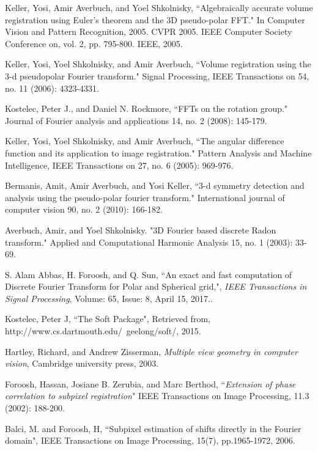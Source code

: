 \documentclass{UCF_ETD}
\begin{document}
\begin{thebibliography}{99}
Keller, Yosi, Amir Averbuch, and Yoel Shkolnisky, ``Algebraically accurate volume registration using Euler's theorem and the 3D pseudo-polar FFT." In Computer Vision and Pattern Recognition, 2005. CVPR 2005. IEEE Computer Society Conference on, vol. 2, pp. 795-800. IEEE, 2005.

Keller, Yosi, Yoel Shkolnisky, and Amir Averbuch, ``Volume registration using the 3-d pseudopolar Fourier transform." Signal Processing, IEEE Transactions on 54, no. 11 (2006): 4323-4331.

Kostelec, Peter J., and Daniel N. Rockmore, ``FFTs on the rotation group." Journal of Fourier analysis and applications 14, no. 2 (2008): 145-179.


Keller, Yosi, Yoel Shkolnisky, and Amir Averbuch, ``The angular difference function and its application to image registration." Pattern Analysis and Machine Intelligence, IEEE Transactions on 27, no. 6 (2005): 969-976.

Bermanis, Amit, Amir Averbuch, and Yosi Keller, ``3-d symmetry detection and analysis using the pseudo-polar fourier transform." International journal of computer vision 90, no. 2 (2010): 166-182.

Averbuch, Amir, and Yoel Shkolnisky. "3D Fourier based discrete Radon transform." Applied and Computational Harmonic Analysis 15, no. 1 (2003): 33-69.

S. Alam Abbas, H. Foroosh, and Q. Sun, ``An exact and fast computation of Discrete Fourier Transform for Polar and Spherical grid,", \emph{IEEE Transactions in Signal Processing}, Volume: 65, Issue: 8, April 15, 2017..

Kostelec, Peter J, ``The Soft Package", Retrieved from, http://www.cs.dartmouth.edu/~geelong/soft/, 2015.


{Hartley, Richard, and Andrew Zisserman, \emph{Multiple view geometry in computer vision}, Cambridge university press, 2003.}

Foroosh, Hassan, Josiane B. Zerubia, and Marc Berthod, ``\emph{Extension of phase correlation to subpixel registration}" IEEE Transactions on Image Processing,  11.3 (2002): 188-200.

Balci, M. and Foroosh, H, ``Subpixel estimation of shifts directly in the Fourier domain", IEEE Transactions on Image Processing, 15(7), pp.1965-1972, 2006.


\end{thebibliography}
\end{document}
